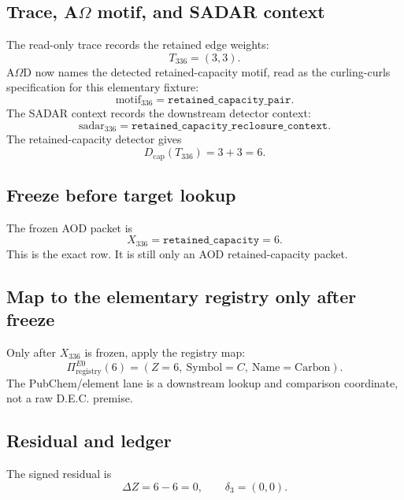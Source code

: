 \subsection{Trace, A\(\Omega\) motif, and SADAR context}

The read-only trace records the retained edge weights:
\[
T_{336}=(3,3).
\]
A$\Omega$D now names the detected retained-capacity motif, read as the curling-curls specification for this elementary fixture:
\[
\mathrm{motif}_{336}=\texttt{retained\_capacity\_pair}.
\]
The SADAR context records the downstream detector context:
\[
\mathrm{sadar}_{336}=\texttt{retained\_capacity\_reclosure\_context}.
\]
The retained-capacity detector gives
\[
D_{\mathrm{cap}}(T_{336})=3+3=6.
\]

\subsection{Freeze before target lookup}

The frozen AOD packet is
\[
X_{336}=\texttt{retained\_capacity}=6.
\]
This is the exact row. It is still only an AOD retained-capacity packet.

\subsection{Map to the elementary registry only after freeze}

Only after $X_{336}$ is frozen, apply the registry map:
\[
\Pi^{E0}_{\mathrm{registry}}(6)=(Z=6,\ \mathrm{Symbol}=C,\ \mathrm{Name}=\mathrm{Carbon}).
\]
The PubChem/element lane is a downstream lookup and comparison coordinate, not a raw D.E.C. premise.

\subsection{Residual and ledger}

The signed residual is
\[
\Delta Z=6-6=0,
\qquad
\delta_3=(0,0).
\]


